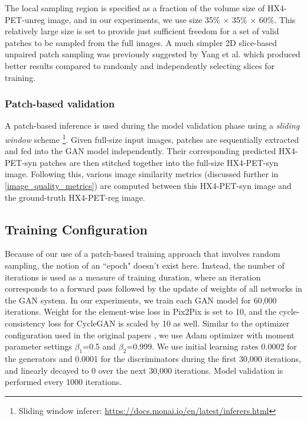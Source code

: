 The local sampling region is specified as a fraction of the volume size of HX4-PET-unreg image, and in our experiments, we use size 35\% $\times$ 35\% $\times$ 60\%. This relatively large size is set to provide just sufficient freedom for a set of valid patches to be sampled from the full images. A much simpler 2D slice-based unpaired patch sampling was previously suggested by Yang et al. \cite{yang2018unpaired} which produced better results compared to randomly and independently selecting slices for training.


\subsubsection{Patch-based validation}
A patch-based inference is used during the model validation phase using a \textit{sliding window} scheme \footnote{Sliding window inferer: \url{https://docs.monai.io/en/latest/inferers.html}}. Given full-size input images, patches are sequentially extracted and fed into the GAN model independently. Their corresponding predicted HX4-PET-syn patches are then stitched together into the full-size HX4-PET-syn image. Following this, various image similarity metrics (discussed further in \ref{image_quality_metrics}) are computed between this HX4-PET-syn image and the ground-truth HX4-PET-reg image. 


\subsection{Training Configuration}

Because of our use of a patch-based training approach that involves random sampling, the notion of an ``epoch" doesn't exist here. Instead, the number of iterations is used as a measure of training duration, where an iteration corresponds to a forward pass followed by the update of weights of all networks in the GAN system. In our experiments, we train each GAN model for 60,000 iterations. 
Weight for the element-wise loss in Pix2Pix is set to 10, and the cycle-consistency loss for CycleGAN is scaled by 10 as well. Similar to the optimizer configuration used in the original papers \cite{isola2017image, zhu2017unpaired}, we use Adam optimizer with moment parameter settings $\beta_1$=0.5 and $\beta_2$=0.999. We use initial learning rates 0.0002 for the generators and 0.0001 for the discriminators during the first 30,000 iterations, and linearly decayed to 0 over the next 30,000 iterations. Model validation is performed every 1000 iterations.

